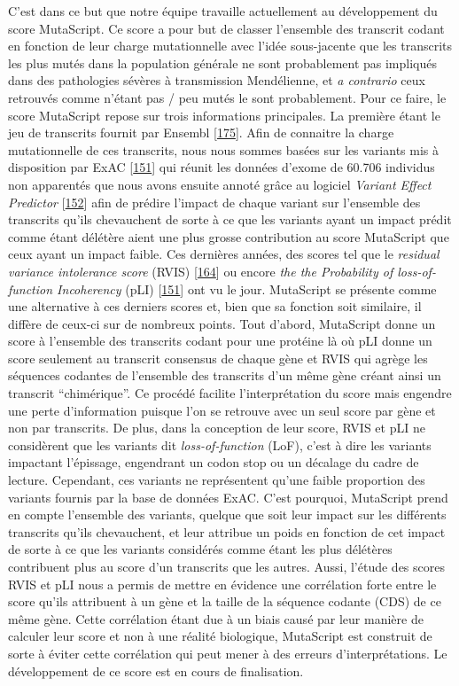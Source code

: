 \documentclass[12pt,a4paper,twoside]{ugathesis}
\theoremstyle{definition}
\theoremstyle{definition}
\theoremstyle{definition}
\theoremstyle{remark}
\begin{document}
C'est dans ce but que notre équipe travaille actuellement au
développement du score MutaScript. Ce score a pour but de classer
l'ensemble des transcrit codant en fonction de leur charge mutationnelle
avec l'idée sous-jacente que les transcrits les plus mutés dans la
population générale ne sont probablement pas impliqués dans des
pathologies sévères à transmission Mendélienne, et \emph{a contrario}
ceux retrouvés comme n'étant pas / peu mutés le sont probablement. Pour
ce faire, le score MutaScript repose sur trois informations principales.
La première étant le jeu de transcrits fournit par Ensembl
{[}\protect\hyperlink{ref-Aken2017}{175}{]}. Afin de connaitre la charge
mutationnelle de ces transcrits, nous nous sommes basées sur les
variants mis à disposition par ExAC
{[}\protect\hyperlink{ref-Lek2016}{151}{]} qui réunit les données
d'exome de 60.706 individus non apparentés que nous avons ensuite annoté
grâce au logiciel \emph{Variant Effect Predictor}
{[}\protect\hyperlink{ref-McLaren2016}{152}{]} afin de prédire l'impact
de chaque variant sur l'ensemble des transcrits qu'ils chevauchent de
sorte à ce que les variants ayant un impact prédit comme étant délétère
aient une plus grosse contribution au score MutaScript que ceux ayant un
impact faible. Ces dernières années, des scores tel que le
\emph{residual variance intolerance score} (RVIS)
{[}\protect\hyperlink{ref-Petrovski2013}{164}{]} ou encore \emph{the the
Probability of loss-of-function Incoherency} (pLI)
{[}\protect\hyperlink{ref-Lek2016}{151}{]} ont vu le jour. MutaScript se
présente comme une alternative à ces derniers scores et, bien que sa
fonction soit similaire, il diffère de ceux-ci sur de nombreux points.
Tout d'abord, MutaScript donne un score à l'ensemble des transcrits
codant pour une protéine là où pLI donne un score seulement au transcrit
consensus de chaque gène et RVIS qui agrège les séquences codantes de
l'ensemble des transcrits d'un même gène créant ainsi un transcrit
``chimérique''. Ce procédé facilite l'interprétation du score mais
engendre une perte d'information puisque l'on se retrouve avec un seul
score par gène et non par transcrits. De plus, dans la conception de
leur score, RVIS et pLI ne considèrent que les variants dit
\emph{loss-of-function} (LoF), c'est à dire les variants impactant
l'épissage, engendrant un codon stop ou un décalage du cadre de lecture.
Cependant, ces variants ne représentent qu'une faible proportion des
variants fournis par la base de données ExAC. C'est pourquoi, MutaScript
prend en compte l'ensemble des variants, quelque que soit leur impact
sur les différents transcrits qu'ils chevauchent, et leur attribue un
poids en fonction de cet impact de sorte à ce que les variants
considérés comme étant les plus délétères contribuent plus au score d'un
transcrits que les autres. Aussi, l'étude des scores RVIS et pLI nous a
permis de mettre en évidence une corrélation forte entre le score qu'ils
attribuent à un gène et la taille de la séquence codante (CDS) de ce
même gène. Cette corrélation étant due à un biais causé par leur manière
de calculer leur score et non à une réalité biologique, MutaScript est
construit de sorte à éviter cette corrélation qui peut mener à des
erreurs d'interprétations. Le développement de ce score est en cours de
finalisation.
\end{document}
